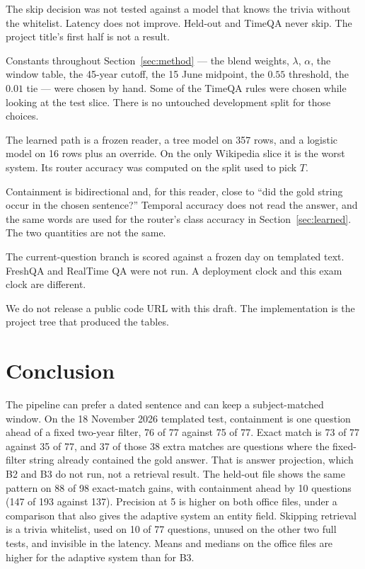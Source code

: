 \documentclass[11pt,letterpaper]{article}
\begin{document}
The skip decision was not tested against a model that knows the trivia without the whitelist.
Latency does not improve.
Held-out and TimeQA never skip.
The project title's first half is not a result.

Constants throughout Section~\ref{sec:method} --- the blend weights, $\lambda$, $\alpha$, the window table, the 45-year cutoff, the 15 June midpoint, the $0.55$ threshold, the $0.01$ tie --- were chosen by hand.
Some of the TimeQA rules were chosen while looking at the test slice.
There is no untouched development split for those choices.

The learned path is a frozen reader, a tree model on 357 rows, and a logistic model on 16 rows plus an override.
On the only Wikipedia slice it is the worst system.
Its router accuracy was computed on the split used to pick $T$.

Containment is bidirectional and, for this reader, close to ``did the gold string occur in the chosen sentence?''
Temporal accuracy does not read the answer, and the same words are used for the router's class accuracy in Section~\ref{sec:learned}.
The two quantities are not the same.

The current-question branch is scored against a frozen day on templated text.
FreshQA and RealTime QA were not run.
A deployment clock and this exam clock are different.

We do not release a public code URL with this draft.
The implementation is the project tree that produced the tables.

\section{Conclusion}

The pipeline can prefer a dated sentence and can keep a subject-matched window.
On the 18 November 2026 templated test, containment is one question ahead of a fixed two-year filter, 76 of 77 against 75 of 77.
Exact match is 73 of 77 against 35 of 77, and 37 of those 38 extra matches are questions where the fixed-filter string already contained the gold answer.
That is answer projection, which B2 and B3 do not run, not a retrieval result.
The held-out file shows the same pattern on 88 of 98 exact-match gains, with containment ahead by 10 questions (147 of 193 against 137).
Precision at 5 is higher on both office files, under a comparison that also gives the adaptive system an entity field.
Skipping retrieval is a trivia whitelist, used on 10 of 77 questions, unused on the other two full tests, and invisible in the latency.
Means and medians on the office files are higher for the adaptive system than for B3.
\end{document}
